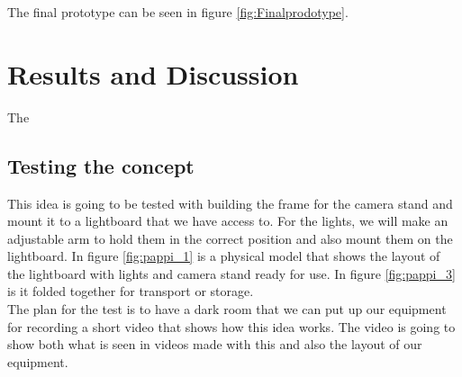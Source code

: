 \documentclass[a4paper]{jpconf}
\begin{document}
The final prototype can be seen in figure \ref{fig:Finalprodotype}.

\section{Results and Discussion}


The 

\subsection{Testing the concept}

This idea is going to be tested with building the frame for the camera stand and mount it to a lightboard that we have access to.
For the lights, we will make an adjustable arm to hold them in the correct position and also mount them on the lightboard.
In figure \ref{fig:pappi_1} is a physical model that shows the layout of the lightboard with lights and camera stand ready for use.
In figure \ref{fig:pappi_3} is it folded together for transport or storage.\\
The plan for the test is to have a dark room that we can put up our equipment for recording a short video that shows how this idea works.
The video is going to show both what is seen in videos made with this and also the layout of our equipment.
\end{document}
